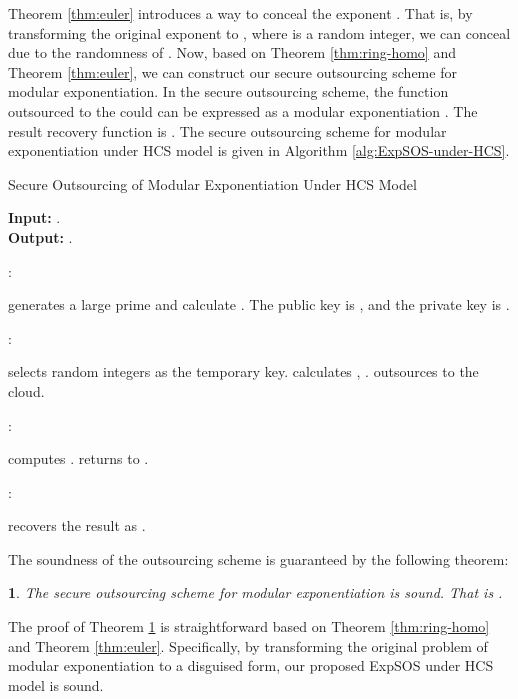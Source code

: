 \documentclass[english,draftcls,onecolumn,11pt]{IEEEtran}
\theoremstyle{definition}
\theoremstyle{plain}
\newtheorem{thm}{\protect\theoremname}
\theoremstyle{plain}
\theoremstyle{definition}
\providecommand{\theoremname}{Theorem}
\begin{document}
Theorem \ref{thm:euler} introduces a way to conceal the exponent
. That is, by transforming the original exponent  to ,
where  is a random integer, we can conceal  due to the randomness
of . Now, based on Theorem \ref{thm:ring-homo} and Theorem \ref{thm:euler},
we can construct our secure outsourcing scheme for modular exponentiation.
In the secure outsourcing scheme, the function 
outsourced to the could can be expressed as a modular exponentiation
. The result recovery function is
. The secure outsourcing scheme for modular
exponentiation under HCS model is given in Algorithm \ref{alg:ExpSOS-under-HCS}. 

\begin{algorithm}[tbh] 
\caption{Secure Outsourcing of Modular Exponentiation Under HCS Model\label{alg:ExpSOS-under-HCS}}

\smallskip 
\textbf{Input:} .\\
\textbf{Output:} .

\smallskip 
:
\begin{algorithmic}[1] 
\STATE  generates a large prime  and calculate . 
\STATE The public key is , and the private key is .  
\end{algorithmic} 

\smallskip 
:  
\begin{algorithmic}[1] 
\STATE  selects random integers  as the temporary key.
\STATE  calculates ,
.
\STATE  outsources  to the cloud.
\end{algorithmic} 

\smallskip
:
\begin{algorithmic}[1] 
\STATE  computes . 
\STATE  returns  to .
\end{algorithmic} 

\smallskip
:
\begin{algorithmic}[1] 
\STATE  recovers the result as .
\end{algorithmic} 
\end{algorithm}

The soundness of the outsourcing scheme is guaranteed by the following
theorem:
\begin{thm}
\label{thm:correctness} The secure outsourcing scheme for modular
exponentiation is sound. That is .
\end{thm}
The proof of Theorem \ref{thm:correctness} is straightforward based
on Theorem \ref{thm:ring-homo} and Theorem \ref{thm:euler}. Specifically,
by transforming the original problem of modular exponentiation to
a disguised form, our proposed ExpSOS under HCS model is sound. 
\end{document}
